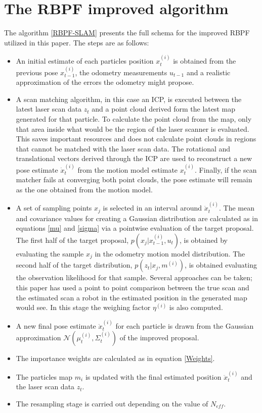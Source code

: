 \documentclass[letterpaper]{article}
\begin{document}
\section{The RBPF improved algorithm}
The algorithm \ref{RBPF-SLAM} presents the full schema for the improved RBPF utilized in this paper. The steps are as follows:
\begin{itemize}
	\item An initial estimate of each particles position $x_t^{(i)}$ is obtained from the previous pose $x_{t-1}^{(i)}$, the odometry measurements $u_{t-1}$ and a realistic approximation of the errors the odometry might propose.
	\item A scan matching algorithm, in this case an ICP, is executed between the latest laser scan data $z_t$ and a point cloud derived form the latest map generated for that particle. To calculate the point cloud from the map, only that area inside what would be the region of the laser scanner is evaluated. This saves important resources and does not calculate point clouds in regions that cannot be matched with the laser scan data. The rotational and translational vectors derived through the ICP are used to reconstruct a new pose estimate $\dot x_t^{(i)}$ from the motion model estimate $x_t^{(i)}$. Finally, if the scan matcher fails at converging both point clouds, the pose estimate will remain as the one obtained from the motion model.
	\item A set of sampling points $x_j$ is selected in an interval around $\dot x_t^{(i)}$. The mean and covariance values for creating a Gaussian distribution are calculated as in equations \ref{mu} and \ref{sigma} via a pointwise evaluation of the target proposal. The first half of the target proposal,  $p(x_j|x_{t-1}^{(i)}, u_t)$, is obtained by evaluating the sample $x_j$ in the odometry motion model distribution. The second half of the target distribution, $p(z_t|x_j, m^{(i)})$, is obtained evaluating the observation likelihood for that sample. Several approaches can be taken; this paper has used a point to point comparison between the true scan and the estimated scan a robot in the estimated position in the generated map would see. In this stage the weighing factor $\eta^{(i)}$ is also computed. 
	\item A new final pose estimate $\ddot x_t^{(i)}$ for each particle is drawn from the Gaussian approximation $\mathcal{N} (\mu_t^{(i)}, \Sigma_t^{(i)})$ of the improved proposal.
	\item The importance weights are calculated as in equation \ref{Weights}.
	\item The particles map $m_i$ is updated with the final estimated position $\ddot x_t^{(i)}$ and the laser scan data $z_t$.
	\item The resampling stage is carried out depending on the value of $N_{eff}$.
\end{itemize}
\end{document}
